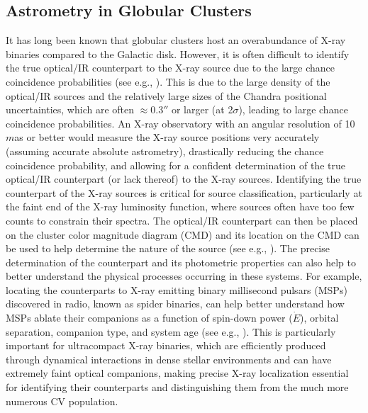 \documentclass{article}
\begin{document}
\subsection{Astrometry in Globular Clusters} 

It has long been known that globular clusters host an overabundance of X-ray binaries compared to the Galactic disk. However, it is often difficult to identify the true optical/IR counterpart to the X-ray source due to the large chance coincidence probabilities (see e.g., \cite{2018ApJ...865...33H,2018MNRAS.479.2834H}). This is due to the large density of the optical/IR sources and the relatively large sizes of the Chandra positional uncertainties, which are often $\approx0.3''$ or larger (at 2$\sigma$), leading to large chance coincidence probabilities. An X-ray observatory with an angular resolution of 10 $m$as or better would measure the X-ray source positions very accurately (assuming accurate absolute astrometry), drastically reducing the chance coincidence probability, and allowing for a confident determination of the true optical/IR counterpart (or lack thereof) to the X-ray sources. Identifying the true counterpart of the X-ray sources is critical for source classification, particularly at the faint end of the X-ray luminosity function, where sources often have too few counts to constrain their spectra. The optical/IR counterpart can then be placed on the cluster color magnitude diagram (CMD) and its location on the CMD can be used to help determine the nature of the source (see e.g., \cite{2005ApJ...625..796H}). The precise determination of the counterpart and its photometric properties can also help to better understand the physical processes occurring in these systems. For example, locating the counterparts to X-ray emitting binary millisecond pulsars (MSPs) discovered in radio, known as spider binaries, can help better understand how MSPs ablate their companions as a function of spin-down power ($\dot{E}$), orbital separation, companion type, and system age (see e.g., \cite{2025ApJ...994....8K}). This is particularly important for ultracompact X-ray binaries, which are efficiently produced through dynamical interactions in dense stellar environments and can have extremely faint optical companions, making precise X-ray localization essential for identifying their counterparts and distinguishing them from the much more numerous CV population.
\end{document}
